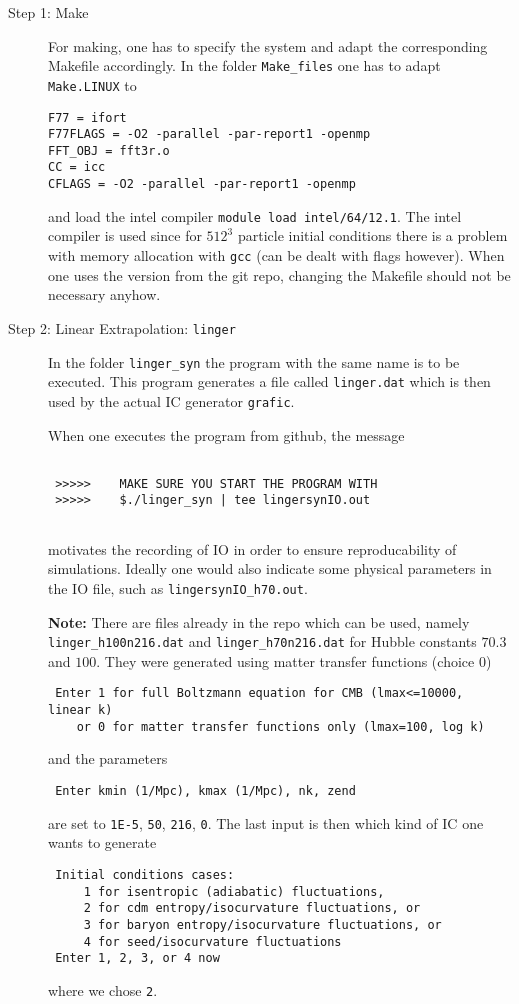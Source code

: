 \documentclass[a4paper,english,10.5pt]{scrartcl}
\begin{document}
\begin{description}

\item[Step 1: Make] 

For making, one has to specify the system and adapt the corresponding 
Makefile accordingly. In the folder \texttt{Make\_files} one has to adapt 
\texttt{Make.LINUX} to 
\begin{verbatim}
F77 = ifort
F77FLAGS = -O2 -parallel -par-report1 -openmp
FFT_OBJ = fft3r.o
CC = icc
CFLAGS = -O2 -parallel -par-report1 -openmp
\end{verbatim}
and load the intel compiler \texttt{module load intel/64/12.1}. The intel 
compiler is used since for $512^3$ particle initial conditions there is a 
problem with memory allocation with \texttt{gcc} (can be dealt with flags however). 
When one uses the version from the git repo, changing the 
Makefile should not be necessary anyhow. 

\item[Step 2: Linear Extrapolation: \texttt{linger}] 

In the folder \texttt{linger\_syn} the program with the same name is to 
be executed. This program generates a file called \texttt{linger.dat} which 
is then used by the actual IC generator \texttt{grafic}. 

When one executes the program from github, the message 
\begin{verbatim} 
 	
 >>>>>    MAKE SURE YOU START THE PROGRAM WITH
 >>>>>    $./linger_syn | tee lingersynIO.out
 	
\end{verbatim}
motivates the recording of IO in order to ensure reproducability of simulations. 
Ideally one would also indicate some physical parameters in 
the IO file, such as \texttt{lingersynIO\_h70.out}. 

\textbf{Note: } There are files already in the repo which can be used, namely 
\texttt{linger\_h100n216.dat} and  \texttt{linger\_h70n216.dat} for 
Hubble constants $70.3$ and $100$. They were 
generated using matter transfer functions (choice 0) 
\begin{verbatim}
 Enter 1 for full Boltzmann equation for CMB (lmax<=10000, linear k)
    or 0 for matter transfer functions only (lmax=100, log k)
\end{verbatim}
and the parameters 
\begin{verbatim}
 Enter kmin (1/Mpc), kmax (1/Mpc), nk, zend
\end{verbatim}
are set to \texttt{1E-5}, \texttt{50}, \texttt{216}, \texttt{0}. 
The last input is then which kind of IC one wants to generate 
\begin{verbatim}
 Initial conditions cases:
     1 for isentropic (adiabatic) fluctuations,
     2 for cdm entropy/isocurvature fluctuations, or
     3 for baryon entropy/isocurvature fluctuations, or
     4 for seed/isocurvature fluctuations
 Enter 1, 2, 3, or 4 now
\end{verbatim}
where we chose \texttt{2}. 


\end{description}
\end{document}
